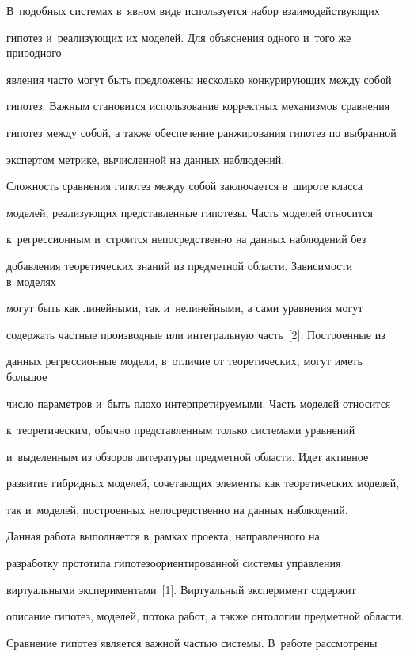 В~подобных системах в~явном виде используется набор взаимодействующих 

гипотез и~реализующих их моделей. Для объяснения одного и~того же природного 

явления часто могут быть предложены несколько конкурирующих между собой 

гипотез. Важным становится использование корректных механизмов сравнения 

гипотез между собой, а также обеспечение ранжирования гипотез по выбранной 

экспертом метрике, вычисленной на данных наблюдений. 

     

      Сложность сравнения гипотез между собой заключается в~широте класса 

моделей, реализующих представленные гипотезы. Часть моделей относится 

к~регрессионным и~строится непосредственно на данных наблюдений без 

добавления теоретических знаний из предметной области. Зависимости в~моделях 

могут быть как линейными, так и~нелинейными, а сами уравнения могут 

содержать частные производные или интегральную часть~[2]. Построенные из 

данных регрессионные модели, в~отличие от теоретических, могут иметь большое 

число параметров и~быть плохо интерпретируемыми. Часть моделей относится 

к~теоретическим, обычно представленным только системами уравнений 

и~выделенным из обзоров литературы предметной области. Идет активное 

развитие гибридных моделей, сочетающих элементы как теоретических моделей, 

так и~моделей, построенных непосредственно на данных наблюдений. 

      

      Данная работа выполняется в~рамках проекта, направленного на 

разработку прототипа гипотезоориентированной системы управления 

виртуальными экспериментами~[1]. Виртуальный эксперимент содержит 

описание гипотез, моделей, потока работ, а также онтологии предметной области. 

Сравнение гипотез является важной частью системы. В~работе рассмотрены 


